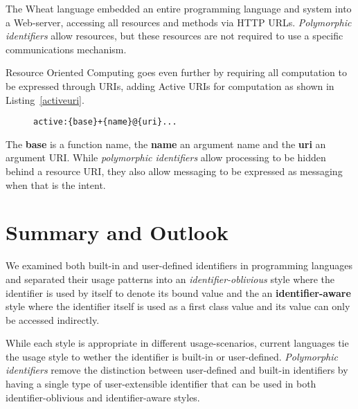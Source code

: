 \documentclass[preprint,authoryear]{acm_proc_article-sp}
\begin{document}
The Wheat language \cite{wheat} embedded an entire programming language
and system into a Web-server, accessing all resources and methods via
HTTP URLs.  \emph{Polymorphic identifiers} allow resources, but these resources
are not required to use a specific communications mechanism.


Resource Oriented Computing \cite{roc} goes even further by
requiring all computation to be expressed through URIs, adding Active URIs
for computation as shown in Listing~\ref{activeuri}.   



\begin{figure}[htbp]
\begin{lstlisting}[style=L,label= activeuri,caption=Active URI.]
  active:{base}+{name}@{uri}...
\end{lstlisting}
\end{figure}

The {\bf base} is a function name, the {\bf name} an argument name and the
{\bf uri} an argument URI.
 While \emph{polymorphic identifiers} allow processing to be
hidden behind a resource URI, they also allow messaging to be expressed
as messaging when that is the intent.


\section{Summary and Outlook}
\label{summary-and-outlook}

We examined both built-in and user-defined identifiers in programming languages 
and separated their usage patterns into an {\em identifier-oblivious} style where
the identifier is used by itself to denote its bound value and the 
an {\bf identifier-aware} style where the identifier itself is used as a first class value
and its value can only be accessed indirectly.

While each style is appropriate in different usage-scenarios, current languages 
tie the usage style to wether the identifier is built-in or user-defined.  \emph{Polymorphic
identifiers} remove the distinction between user-defined and built-in identifiers by having
a single type of user-extensible identifier that can be used in both identifier-oblivious
and identifier-aware styles.
\end{document}
